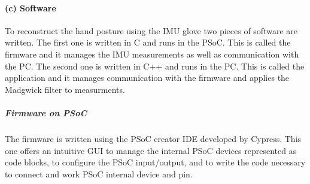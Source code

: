 \paragraph{(c) Software}

To reconstruct the hand posture using the IMU glove two pieces of software are written. The first one is written in C and runs in the PSoC. This is called the firmware and it manages the IMU measurements as well as communication with the PC.
The second one is written in C++ and runs in the PC. This is called the application and it manages communication with the firmware and applies the Madgwick filter to measurments.

\subparagraph{Firmware on PSoC}

The firmware is written using the PSoC creator IDE developed by Cypress. This one offers an intuitive GUI to
manage the internal PSoC devices represented as code blocks, to configure the PSoC input/output, and to write the code necessary to connect and work PSoC internal device and pin. %

